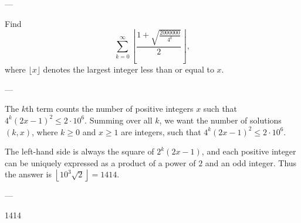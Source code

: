 
---

Find \[\sum_{k=0}^\infty\left\lfloor\frac{1+\sqrt{\frac{2000000}{4^k}}}2\right\rfloor,\]
where $\lfloor x\rfloor$  denotes the largest integer less than or equal to $x$.

---

The $k$th term counts the number of positive integers $x$ such that $4^k(2x-1)^2\le2\cdot10^6$. Summing over all $k$, we want the number of solutions $(k,x)$, where $k\ge0$ and $x\ge1$ are integers, such that $4^k(2x-1)^2\le2\cdot10^6$.

The left-hand side is always the square of $2^k(2x-1)$, and each positive integer can be uniquely expressed as a product of a power of $2$ and an odd integer. Thus the answer is $\left\lfloor10^3\sqrt2\right\rfloor=1414$.

---

1414
